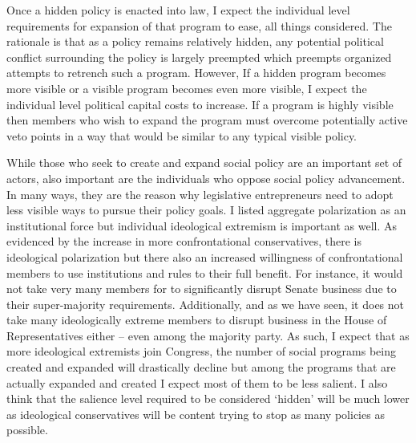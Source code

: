 \documentclass[12pt]{article}
\begin{document}
Once a hidden policy is enacted into law, I expect the individual level requirements for expansion of that program to ease, all things considered. The rationale is that as a policy remains relatively hidden, any potential political conflict surrounding the policy is largely preempted which preempts organized attempts to retrench such a program. However, If a hidden program becomes more visible or a visible program becomes even more visible, I expect the individual level political capital costs to increase. If a program is highly visible then members who wish to expand the program must overcome potentially active veto points in a way that would be similar to any typical visible policy.

While those who seek to create and expand social policy are an important set of actors, also important are the individuals who oppose social policy advancement. In many ways, they are the reason why legislative entrepreneurs need to adopt less visible ways to pursue their policy goals. I listed aggregate polarization as an institutional force but individual ideological extremism is important as well. As evidenced by the increase in more confrontational conservatives, there is ideological polarization but there also an increased willingness of confrontational members to use institutions and rules to their full benefit. For instance, it would not take very many members for to significantly disrupt Senate business due to their super-majority requirements. Additionally, and as we have seen, it does not take many ideologically extreme members to disrupt business in the House of Representatives either -- even among the majority party. As such, I expect that as more ideological extremists join Congress, the number of social programs being created and expanded will drastically decline but among the programs that are actually expanded and created I expect most of them to be less salient. I also think that the salience level required to be considered `hidden' will be much lower as ideological conservatives will be content trying to stop as many policies as possible. 
\end{document}
